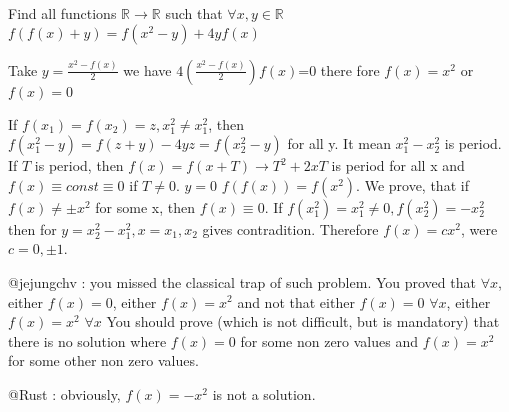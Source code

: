 \begin{solution}
	\begin{tcolorbox}Find all functions $\mathbb{R}\to\mathbb{R}$ such that $\forall x,y\in\mathbb{R}$
                                   $     f(f(x)+y)=f(x^{2}-y)+ 4yf(x)$\end{tcolorbox}
Take $y=\frac{x^2-f(x)}{2}$ we have $4(\frac{x^2-f(x)}{2})f(x)$=0
 there fore $f(x)=x^2$ or $f(x)=0$
\end{solution}



\begin{solution}
	If $f(x_1)=f(x_2)=z, x_1^2\not =x_1^2$, then $f(x_1^2-y)=f(z+y)-4yz=f(x_2^2-y)$ for all y. It mean $x_1^2-x_2^2$ is period. If $T$ is period, then $f(x)=f(x+T)\to T^2+2xT$ is period for all x and $f(x)\equiv const\equiv 0$ if $T\not =0$. 
$y=0$ $f(f(x))=f(x^2)$. We prove, that if $f(x)\not =\pm x^2$ for some x, then $f(x)\equiv 0$.
If $f(x_1^2)=x_1^2\not =0,f(x_2^2)=-x_2^2$ then for $y=x_2^2-x_1^2, x=x_1,x_2$ gives contradition.
Therefore $f(x)=cx^2$, were $c=0,\pm 1$.
\end{solution}



\begin{solution}
	@jejungchv : you missed the classical trap of such problem. You proved that $\forall x$, either $f(x)=0$, either $f(x)=x^2$ and not that either $f(x)=0$ $\forall x$, either $f(x)=x^2$ $\forall x$
You should prove (which is not difficult, but is mandatory) that there is no solution where $f(x)=0$ for some non zero values and $f(x)=x^2$ for some other non zero values.

@Rust : obviously, $f(x)=-x^2$ is not a solution.
\end{solution}



